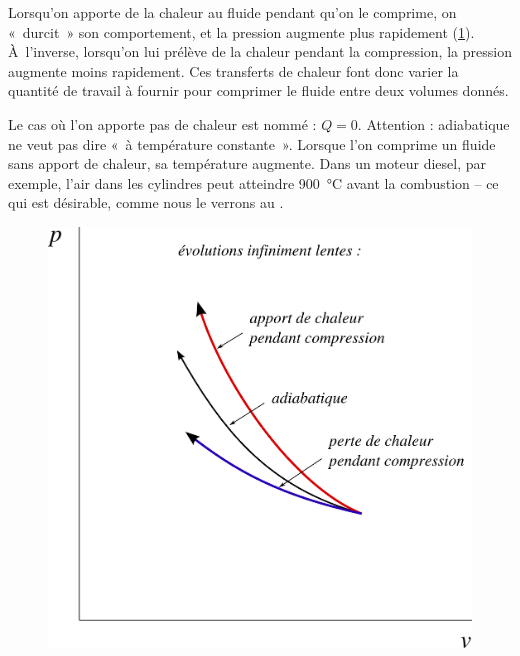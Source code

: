 		Lorsqu’on apporte de la chaleur au fluide pendant qu’on le comprime, on «~durcit~» son comportement, et la pression augmente plus rapidement (\cref{fig_p-v_ajout_retrait_chaleur}). À~l’inverse, lorsqu’on lui prélève de la chaleur pendant la compression, la pression augmente moins rapidement. Ces transferts de chaleur font donc varier la quantité de travail à fournir pour comprimer le fluide entre deux volumes donnés.
		
		Le cas où l’on apporte pas de chaleur est nommé  : $Q = 0$. Attention : adiabatique ne veut pas dire «~à température constante~». Lorsque l’on comprime un fluide sans apport de chaleur, sa température augmente. Dans un moteur diesel, par exemple, l’air dans les cylindres peut atteindre \SI{900}{\degreeCelsius} avant la combustion -- ce qui est désirable, comme nous le verrons au \courssept.

		\begin{figure}
			\begin{center}
			\includegraphics[width=\didacticpvdiagramwidth]{images/pv_transfert_chaleur.png}
			\end{center}
			\label{fig_p-v_ajout_retrait_chaleur}
		\end{figure}


